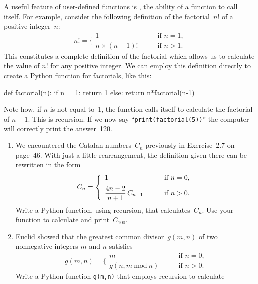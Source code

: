 \documentclass[12pt]{article}
\begin{document}
\begin{exercises}
\exskip A useful feature of user-defined functions is , the
ability of a function to call itself.  For example, consider the following
definition of the factorial~$n!$ of a positive integer~$n$:
\begin{displaymath}
n! = \biggl\lbrace\begin{array}{ll}
  1 & \qquad\mbox{if $n=1$,} \\
  n\times(n-1)! & \qquad\mbox{if $n>1$.}
\end{array}
\end{displaymath}
This constitutes a complete definition of the factorial which allows us to
calculate the value of $n!$ for any positive integer.  We can employ this
definition directly to create a Python function for factorials, like this:
\begin{code}
def factorial(n):
    if n==1:
        return 1
    else:
        return n*factorial(n-1)
\end{code}
Note how, if $n$ is not equal to~1, the function calls itself to calculate
the factorial of $n-1$.  This is recursion.  If we now say
``\verb|print(factorial(5))|'' the computer will correctly print the
answer~120.
\begin{enumerate}\setlength{\itemsep}{0pt}
\item We encountered the Catalan numbers~$C_n$ previously in Exercise~2.7
  on page~46.  With just a little rearrangement, the definition given there
  can be rewritten in the form
\begin{displaymath}
C_n = \left\lbrace\begin{array}{ll}
  \rule[-9pt]{0pt}{10pt}1 & \qquad\mbox{if $n=0$,} \\
  \dfrac{4n-2}{n+1}\,C_{n-1} & \qquad\mbox{if $n>0$.}
\end{array}\right.
\end{displaymath}
Write a Python function, using recursion, that calculates~$C_n$.  Use your
function to calculate and print~$C_{100}$.
\item Euclid showed that the greatest common divisor~$g(m,n)$ of two
  nonnegative integers $m$ and $n$ satisfies
\begin{displaymath}
g(m,n) = \biggl\lbrace\begin{array}{ll}
  m & \qquad\mbox{if $n=0$,} \\
  g(n,m\>\textrm{mod}\>n) & \qquad\mbox{if $n>0$.}
\end{array}
\end{displaymath}
Write a Python function \verb|g(m,n)| that employs recursion to calculate

\end{enumerate}
\end{exercises}
\end{document}
